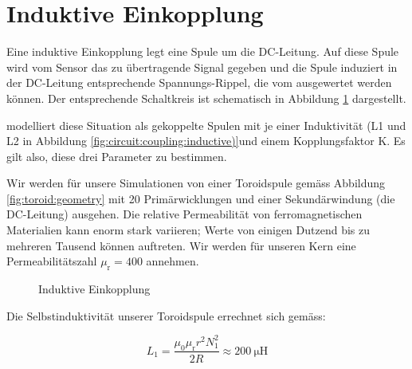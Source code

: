 \section{Induktive Einkopplung}
\label{sec:simu:coupling:inductive}

Eine induktive Einkopplung legt eine  Spule um die DC-Leitung. Auf diese Spule
wird vom Sensor  das zu \"ubertragende Signal gegeben und  die Spule induziert
in der DC-Leitung entsprechende  Spannungs-Rippel, die vom \Master ausgewertet
werden k\"onnen. Der  entsprechende Schaltkreis  ist schematisch  in Abbildung
\ref{fig:circuit:coupling:inductive} dargestellt.

    modelliert   diese    Situation   als    gekoppelte   Spulen
mit    je     einer    Induktivit\"at     (L1    und    L2     in    Abbildung
\ref{fig:circuit:coupling:inductive)}und  einem   Kopplungsfaktor  K. Es  gilt
also, diese drei Parameter zu bestimmen.

Wir  werden   f\"ur  unsere   Simulationen  von  einer   Toroidspule  gem\"ass
Abbildung  \ref{fig:toroid:geometry}  mit   20  Prim\"arwicklungen  und  einer
Sekund\"arwindung (die DC-Leitung) ausgehen.  Die relative Permeabilit\"at von
ferromagnetischen Materialien  kann enorm  stark variieren; Werte  von einigen
Dutzend bis zu  mehreren Tausend k\"onnen auftreten. Wir  werden f\"ur unseren
Kern eine Permeabilit\"atszahl $\mu_{\mathrm{r}} = 400$ annehmen.

\clearpage
\begin{figure}[h!tb]
    \centering
    
    \caption{Induktive Einkopplung}
    \label{fig:circuit:coupling:inductive}
\end{figure}


Die Selbstinduktivit\"at unserer Toroidspule errechnet sich gem\"ass:

\begin{equation}
    \label{eq:selfInductance:toroid:primary}
    L_{\mathrm{1}} = \frac{\mu_{0} \mu_{\mathrm{r}} r^2 N_1^2}{2 R} \approx \SI{200}{\micro\henry}
\end{equation}


